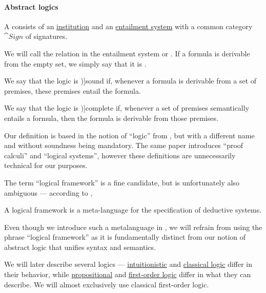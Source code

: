 \paragraph{Abstract logics}

\begin{definition}\label{def:abstract_logic}\mimprovised
  A  consists of an \hyperref[def:institution]{institution} and an \hyperref[def:entailment_system]{entailment system} with a common category \( \cat{Sign} \) of signatures.

  We will call the relation in the entailment system  or . If a formula is derivable from the empty set, we simply say that it is .

  \begin{thmenum}
     We say that the logic is \term[ru=корректная (система) (\cite[37]{Герасимов2011Вычислимость})]{sound} if, whenever a formula is derivable from a set of premises, these premises entail the formula.

     We say that the logic is \term[ru=полная (система) (\cite[44]{Герасимов2011Вычислимость})]{complete} if, whenever a set of premises semantically entails a formula, then the formula is derivable from those premises.
  \end{thmenum}
\end{definition}
\begin{comments}
  \item Our definition is based in the notion of \enquote{logic} from \cite[def. 6]{Meseguer1989GeneralLogics}, but with a different name and without soundness being mandatory. The same paper introduces \enquote{proof calculi} and \enquote{logical systems}, however these definitions are unnecessarily technical for our purposes.

  The term \enquote{logical framework} is a fine candidate, but is unfortunately also ambiguous --- according to ,
  \begin{displayquote}
    A logical framework is a meta-language for the specification of deductive systems.
  \end{displayquote}

  Even though we introduce such a metalanguage in , we will refrain from using the phrase \enquote{logical framework} as it is fundamentally distinct from our notion of abstract logic that unifies syntax and semantics.

  \item We will later describe several logics --- \hyperref[con:intuitionistic_logic]{intuitionistic} and \hyperref[con:classical_logic]{classical logic} differ in their behavior, while \hyperref[sec:propositional_logic]{propositional} and \hyperref[sec:first_order_logic]{first-order logic} differ in what they can describe. We will almost exclusively use classical first-order logic.
\end{comments}

